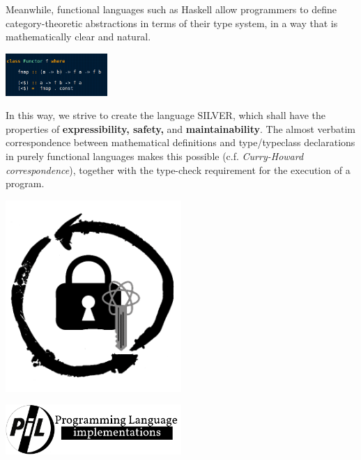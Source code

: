 \documentclass{article}
\begin{document}
\begin{multicols*}{3}
    \bigskip
    
    Meanwhile, functional languages such as Haskell allow programmers to define category-theoretic abstractions in terms of their type system, in a way that is mathematically clear and natural.

    \includegraphics[width=0.29\textwidth]{fctrHskExl.png}

    In this way, we strive to create the language SILVER, %
     which shall have the properties of \textbf{expressibility, safety,} and \textbf{maintainability}. The almost verbatim correspondence between mathematical definitions and type/typeclass declarations in purely functional languages makes this possible (c.f. \emph{Curry-Howard correspondence}), together with the type-check requirement for the execution of a program.

     \begin{minipage}{0.15\textwidth}
         \includegraphics[width=0.5\textwidth]{crypto_0.png}
     \end{minipage}%
     \begin{minipage}{0.15\textwidth}
         \includegraphics[width=0.5\textwidth]{pil-logo.png}
     \end{minipage}
    
    \end{multicols*}
        
\end{document}
